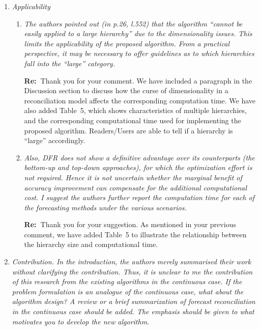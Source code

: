 \documentclass[11pt,a4paper]{article}
\newcommand{\RE}[2][Re:~]{{\color{blue}\textbf{#1}#2}}
\begin{document}
\begin{enumerate}%
\item \textit{Applicability}

  \begin{enumerate}
    \item \textit{The authors pointed out (in p.26, l.552) that the algorithm ``cannot be easily applied to a large hierarchy'' due to the dimensionality issues. This limits the applicability of the proposed algorithm. From a practical perspective, it may be necessary to offer guidelines as to which hierarchies fall into the ``large'' category. }

    \RE{Thank you for your comment. We have included a paragraph in the Discussion section to discuss how the curse of dimensionality in a reconciliation model affects the corresponding computation time. We have also added Table~5, which shows characteristics of multiple hierarchies, and the corresponding computational time used for implementing the proposed algorithm. Readers/Users are able to tell if a hierarchy is ``large'' accordingly.}


    \item \textit{Also, DFR does not show a definitive advantage over its counterparts (the bottom-up and top-down approaches), for which the optimization effort is not required. Hence it is not uncertain whether the marginal benefit of accuracy improvement can compensate for the additional computational cost. I suggest the authors further report the computation time for each of the forecasting methods under the various scenarios.}

    \RE{Thank you for your suggestion. As mentioned in your previous comment, we have added Table~5 to illustrate the relationship between the hierarchy size and computational time.}


  \end{enumerate}

\item \textit{Contribution. In the introduction, the authors merely summarised their work without clarifying the contribution. Thus, it is unclear to me the contribution of this research from the existing algorithms in the continuous case. If the problem formulation is an analogue of the continuous case, what about the algorithm design? A review or a brief summarization of forecast reconciliation in the continuous case should be added. The emphasis should be given to what motivates you to develop the new algorithm.}


\end{enumerate}
\end{document}
